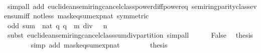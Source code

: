 \begin{isabellebody}
\ \ \ \ \ \ \isamarkupfalse%
\ {\isacharparenleft}{\kern0pt}simp{\isacharunderscore}{\kern0pt}all\ add{\isacharcolon}{\kern0pt}\ euclidean{\isacharunderscore}{\kern0pt}semiring{\isacharunderscore}{\kern0pt}cancel{\isacharunderscore}{\kern0pt}class{\isachardot}{\kern0pt}power{\isacharunderscore}{\kern0pt}diff{\isacharunderscore}{\kern0pt}power{\isacharunderscore}{\kern0pt}eq\ semiring{\isacharunderscore}{\kern0pt}parity{\isacharunderscore}{\kern0pt}class{\isachardot}{\kern0pt}even{\isacharunderscore}{\kern0pt}sum{\isacharunderscore}{\kern0pt}iff\ not{\isacharunderscore}{\kern0pt}less\ mask{\isacharunderscore}{\kern0pt}eq{\isacharunderscore}{\kern0pt}sum{\isacharunderscore}{\kern0pt}exp{\isacharunderscore}{\kern0pt}nat\ {\isacharbrackleft}{\kern0pt}symmetric{\isacharbrackright}{\kern0pt}{\isacharparenright}{\kern0pt}\isanewline
\ \ \ \ \isamarkupfalse%
\ \isamarkupfalse%
\ {\isacartoucheopen}odd\ {\isacharparenleft}{\kern0pt}sum\ {\isacharparenleft}{\kern0pt}{\isacharparenleft}{\kern0pt}{\isacharcircum}{\kern0pt}{\isacharparenright}{\kern0pt}\ {\isacharparenleft}{\kern0pt}{}{\isacharcolon}{\kern0pt}{\isacharcolon}{\kern0pt}nat{\isacharparenright}{\kern0pt}{\isacharparenright}{\kern0pt}\ {\isacharbraceleft}{\kern0pt}q{\isachardot}{\kern0pt}\ q\ {\isacharless}{\kern0pt}\ m{\isacharbraceright}{\kern0pt}\ div\ {}\ {\isacharcircum}{\kern0pt}\ n{\isacharparenright}{\kern0pt}{\isacartoucheclose}\isanewline
\ \ \ \ \ \ \isamarkupfalse%
\ {\isacharparenleft}{\kern0pt}subst\ euclidean{\isacharunderscore}{\kern0pt}semiring{\isacharunderscore}{\kern0pt}cancel{\isacharunderscore}{\kern0pt}class{\isachardot}{\kern0pt}sum{\isacharunderscore}{\kern0pt}div{\isacharunderscore}{\kern0pt}partition{\isacharparenright}{\kern0pt}\ simp{\isacharunderscore}{\kern0pt}all\isanewline
\ \ \ \ \isamarkupfalse%
\ False\ \isamarkupfalse%
\ {\isacharquery}{\kern0pt}thesis\isanewline
\ \ \ \ \ \ \isamarkupfalse%
\ {\isacharparenleft}{\kern0pt}simp\ add{\isacharcolon}{\kern0pt}\ mask{\isacharunderscore}{\kern0pt}eq{\isacharunderscore}{\kern0pt}sum{\isacharunderscore}{\kern0pt}exp{\isacharunderscore}{\kern0pt}nat{\isacharparenright}{\kern0pt}\isanewline
\ \ \isamarkupfalse%
\isanewline
\ \ \isamarkupfalse%
\ \isamarkupfalse%
\ {\isacharquery}{\kern0pt}thesis\ \isacommand{{\isachardot}{\kern0pt}}\isamarkupfalse%
\isanewline
{}\isamarkupfalse%
%
\endisatagproof
{\isafoldproof}%
%
\isadelimproof

\end{isabellebody}
